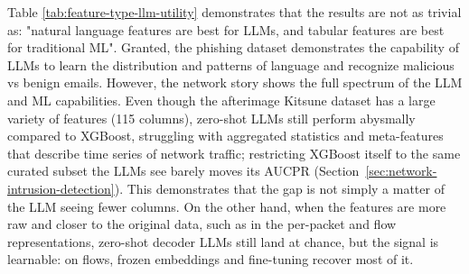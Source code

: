 \documentclass{jmlr}
\begin{document}
Table \ref{tab:feature-type-llm-utility} demonstrates that the results are not as trivial as: "natural language features are best for LLMs, and tabular features are best for traditional ML". Granted, the phishing dataset demonstrates the capability of LLMs to learn the distribution and patterns of language and recognize malicious vs benign emails. However, the network story shows the full spectrum of the LLM and ML capabilities. Even though the afterimage Kitsune dataset has a large variety of features (115 columns), zero-shot LLMs still perform abysmally compared to XGBoost, struggling with aggregated statistics and meta-features that describe time series of network traffic; restricting XGBoost itself to the same curated subset the LLMs see barely moves its AUCPR (Section~\ref{sec:network-intrusion-detection}). This demonstrates that the gap is not simply a matter of the LLM seeing fewer columns. On the other hand, when the features are more raw and closer to the original data, such as in the per-packet and flow representations, zero-shot decoder LLMs still land at chance, but the signal is learnable: on flows, frozen embeddings and fine-tuning recover most of it.
\end{document}
